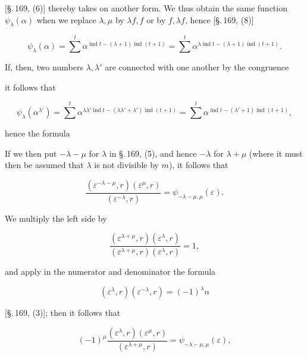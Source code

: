 [\S.\,169, (6)] thereby takes on another form. We thus obtain
the same function $\psi_\lambda(\alpha)$ when we replace $\lambda,\mu$ by $\lambda f, f$ or
by $f, \lambda f$, hence [\S.\,169, (8)]

\[
\psi_\lambda(\alpha) = \sum^{t} \alpha^{\operatorname{ind} t - (\lambda+1)\operatorname{ind}(t+1)}
= \sum^{t} \alpha^{\lambda \operatorname{ind} t - (\lambda+1)\operatorname{ind}(t+1)}.
\]

If, then, two numbers $\lambda,\lambda'$ are connected with one another by the
congruence


it follows that

\[
\psi_\lambda(\alpha^{\lambda'}) = \sum^{t} \alpha^{\lambda\lambda' \operatorname{ind} t - (\lambda\lambda'+\lambda')\operatorname{ind}(t+1)}
= \sum^{t} \alpha^{\operatorname{ind} t - (\lambda'+1)\operatorname{ind}(t+1)},
\]

hence the formula


If we then put $-\lambda-\mu$ for $\lambda$ in \S.\,169, (5), and
hence $-\lambda$ for $\lambda+\mu$ (where it must then be assumed that
$\lambda$ is not divisible by $m$), it follows that

\[
\frac{(\varepsilon^{-\lambda-\mu}, r)(\varepsilon^\mu, r)}{(\varepsilon^{-\lambda}, r)} = \psi_{-\lambda-\mu,\mu}(\varepsilon).
\]

We multiply the left side by

\[
\frac{(\varepsilon^{\lambda+\mu}, r)(\varepsilon^\lambda, r)}{(\varepsilon^{\lambda+\mu}, r)(\varepsilon^\lambda, r)} = 1,
\]

and apply in the numerator and denominator the formula

\[
(\varepsilon^\lambda, r)(\varepsilon^{-\lambda}, r) = (-1)^\lambda n
\]

[\S.\,169, (3)]; then it follows that

\[
(-1)^\mu \frac{(\varepsilon^\lambda, r)(\varepsilon^\mu, r)}{(\varepsilon^{\lambda+\mu}, r)} = \psi_{-\lambda-\mu,\mu}(\varepsilon),
\]

